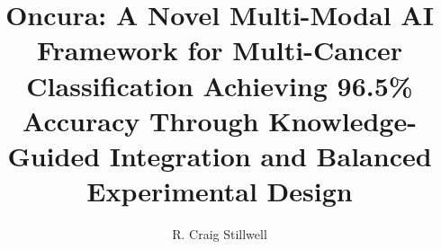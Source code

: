 \documentclass[manuscript, screen, review]{jair}
\begin{document}
\title[Oncura: Multi-Modal AI for Cancer Classification]{Oncura: A Novel Multi-Modal AI Framework for Multi-Cancer Classification Achieving 96.5\% Accuracy Through Knowledge-Guided Integration and Balanced Experimental Design}
\author{R. Craig Stillwell}

\end{document}
